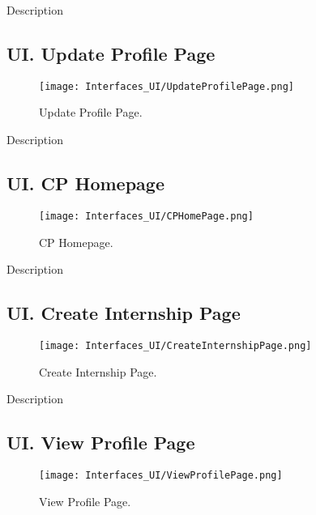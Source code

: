 Description

\subsection*{UI\cui . Update Profile Page}

\begin{figure}[H]
    \begin{center}
        \texttt{[image: Interfaces\_UI/UpdateProfilePage.png]}
        \caption{Update Profile Page.}
        \label{fig:update_profile_page}%
    \end{center}
\end{figure}

Description

\subsection*{UI\cui . CP Homepage}

\begin{figure}[H]
    \begin{center}
        \texttt{[image: Interfaces\_UI/CPHomePage.png]}
        \caption{CP Homepage.}
        \label{fig:company_homepage}%
    \end{center}
\end{figure}

Description

\subsection*{UI\cui . Create Internship Page}

\begin{figure}[H]
    \begin{center}
        \texttt{[image: Interfaces\_UI/CreateInternshipPage.png]}
        \caption{Create Internship Page.}
        \label{fig:create_internship_page}%
    \end{center}   
\end{figure}

Description

\subsection*{UI\cui . View Profile Page}

\begin{figure}[H]
    \begin{center}
        \texttt{[image: Interfaces\_UI/ViewProfilePage.png]}
        \caption{View Profile Page.}
        \label{fig:view_profile_page}%
    \end{center}
\end{figure}

